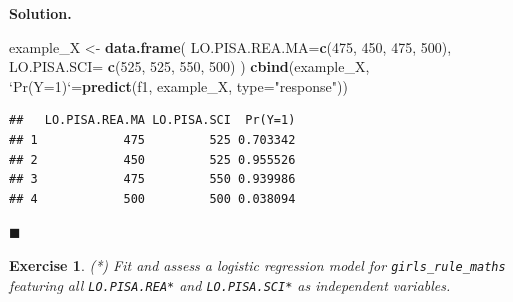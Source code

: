 \documentclass[10pt,b5paper,krantz1]{krantz}
\newenvironment{Shaded}{\begin{snugshade}}{\end{snugshade}}
\newcommand{\DataTypeTok}[1]{\textcolor[rgb]{0.27,0.27,0.27}{#1}}
\newcommand{\DecValTok}[1]{\textcolor[rgb]{0.06,0.06,0.06}{#1}}
\newcommand{\KeywordTok}[1]{\textcolor[rgb]{0.27,0.27,0.27}{\textbf{#1}}}
\newcommand{\NormalTok}[1]{#1}
\newcommand{\StringTok}[1]{\textcolor[rgb]{0.5,0.5,0.5}{#1}}
\newtheorem{exercise}{Exercise}[chapter]
\newenvironment{solution}{%
\bigskip\noindent\textbf{Solution. }%
\it\ignorespaces%
\ignorespaces%
}{\ignorespaces%
\hfill$\blacksquare$%
}
\begin{document}
\begin{solution}
\begin{Shaded}
\begin{Highlighting}[]
\NormalTok{example_X <-}\StringTok{ }\KeywordTok{data.frame}\NormalTok{(}
    \DataTypeTok{LO.PISA.REA.MA=}\KeywordTok{c}\NormalTok{(}\DecValTok{475}\NormalTok{, }\DecValTok{450}\NormalTok{, }\DecValTok{475}\NormalTok{, }\DecValTok{500}\NormalTok{),}
    \DataTypeTok{LO.PISA.SCI=}   \KeywordTok{c}\NormalTok{(}\DecValTok{525}\NormalTok{, }\DecValTok{525}\NormalTok{, }\DecValTok{550}\NormalTok{, }\DecValTok{500}\NormalTok{)}
\NormalTok{)}
\KeywordTok{cbind}\NormalTok{(example_X,}
    \StringTok{`}\DataTypeTok{Pr(Y=1)}\StringTok{`}\NormalTok{=}\KeywordTok{predict}\NormalTok{(f1, example_X, }\DataTypeTok{type=}\StringTok{"response"}\NormalTok{))}
\end{Highlighting}
\end{Shaded}

\begin{verbatim}
##   LO.PISA.REA.MA LO.PISA.SCI  Pr(Y=1)
## 1            475         525 0.703342
## 2            450         525 0.955526
## 3            475         550 0.939986
## 4            500         500 0.038094
\end{verbatim}

\end{solution}

\begin{exercise}

(*) Fit and assess a logistic regression model for \texttt{girls\_rule\_maths}
featuring all \texttt{LO.PISA.REA*} and \texttt{LO.PISA.SCI*} as independent variables.

\end{exercise}
\end{document}
